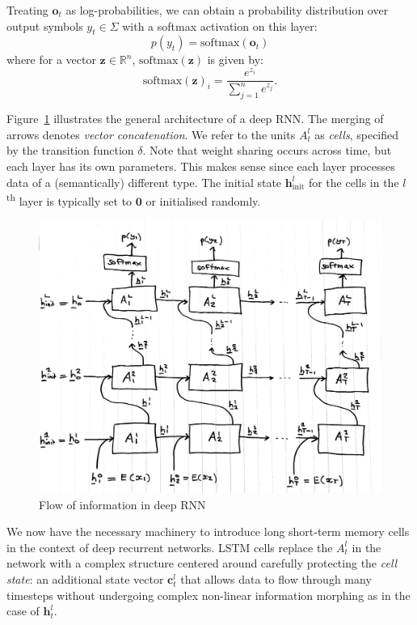 \documentclass[12pt,a4paper,twoside,openright]{report}
\newcommand{\vect}[1]{\boldsymbol{\mathbf{#1}}}
\begin{document}
Treating $\vect{o}_t$ as log-probabilities, we can obtain a probability
distribution over output symbols $y_t \in \Sigma$ with a softmax activation on
this layer:
$$ p(y_t) = \mathrm{softmax}(\vect{o}_t) $$
where for a vector $\vect{z} \in \mathbb{R}^n$, $\mathrm{softmax}(\vect{z})$ is
given by:
$$ \mathrm{softmax}(\vect{z})_i = \frac{ e^{z_i} }{ \sum_{j = 1}^n e^{z_j} }. $$

Figure~\ref{fig:deep-rnn-arch} illustrates the general architecture of a deep
RNN. The merging of arrows denotes \emph{vector concatenation}. We refer to the
units $A_t^l$ as \emph{cells}, specified by the transition function $\delta$.
Note that weight sharing occurs across time, but each layer has its own
parameters. This makes sense since each layer processes data of a (semantically)
different type. The initial state $\vect{h}_{\mathrm{init}}^l$ for the cells in
the $l$\textsuperscript{th} layer is typically set to $\vect{0}$ or initialised
randomly. 

\begin{figure}[H]
\centering
\includegraphics[width=350pt]{figs/deep_rnn_tmp.jpg}
\caption{Flow of information in deep RNN}
\label{fig:deep-rnn-arch}
\end{figure}

We now have the necessary machinery to introduce long short-term memory cells in
the context of deep recurrent networks. LSTM cells replace the $A_t^l$ in the
network with a complex structure centered around carefully protecting the
\emph{cell state}: an additional state vector $\vect{c}_t^l$ that allows data to
flow through many timesteps without undergoing complex non-linear information
morphing as in the case of $\vect{h}_t^l$.
\end{document}
